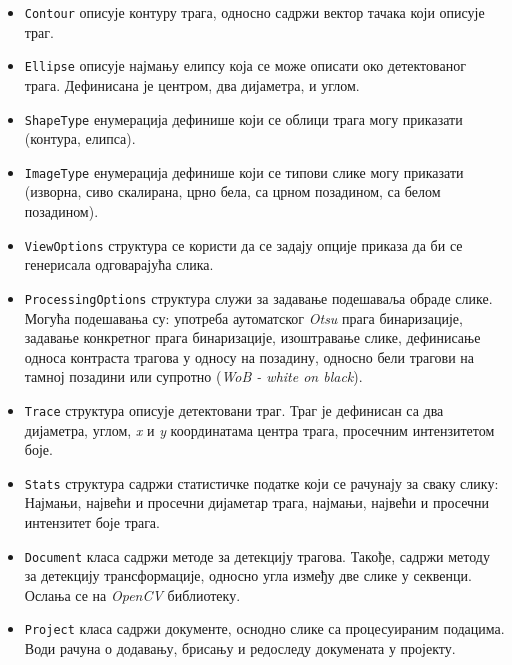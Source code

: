 \documentclass[11pt,a4paper,serbian,oneside]{book}
\begin{document}
\begin{itemize}
  \item \texttt{Contour} описује контуру трага, односно садржи вектор тачака који описује траг.
  \item \texttt{Ellipse} описује најмању елипсу која се може описати око детектованог трага. Дефинисана је центром, два дијаметра, и углом.
  \item \texttt{ShapeType} енумерација дефинише који се облици трага могу приказати (контура, елипса).
  \item \texttt{ImageType} енумерација дефинише који се типови слике могу приказати (изворна, сиво скалирана, црно бела, са црном позадином, са белом позадином).
  \item \texttt{ViewOptions} структура се користи да се задају опције приказа да би се генерисала одговарајућа слика. 
  \item \texttt{ProcessingOptions} структура служи за задавање подешаваља обраде слике. Могућа подешавања су: употреба аутоматског \textit{Otsu} прага бинаризације, задавање конкретног прага бинаризације, изоштравање слике, дефинисање односа контраста трагова у односу на позадину, односно бели трагови на тамној позадини или супротно (\textit{WoB - white on black}).
  \item \texttt{Trace} структура описује детектовани траг. Траг је дефинисан са два дијаметра, углом, \textit{x} и \textit{y} координатама центра трага, просечним интензитетом боје.
  \item \texttt{Stats} структура садржи статистичке податке који се рачунају за сваку слику: Најмањи, највећи и просечни дијаметар трага, најмањи, највећи и просечни интензитет боје трага.
  \item \texttt{Document} класа садржи методе за детекцију трагова. Такође, садржи методу за детекцију трансформације, односно угла између две слике у секвенци. Ослања се на \textit{OpenCV} библиотеку.
  \item \texttt{Project} класа садржи документе, оснодно слике са процесуираним подацима. Води рачуна о додавању, брисању и  редоследу докумената у пројекту.
\end{itemize}
\end{document}
